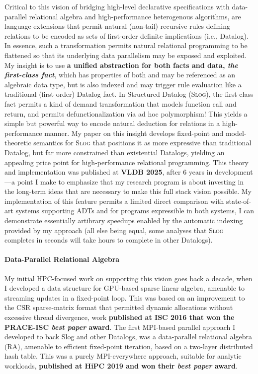 \documentclass[12pt]{article}
\begin{document}
Critical to this vision of bridging high-level declarative specifications with data-parallel relational algebra and high-performance heterogenous algorithms, are language extensions that permit natural (non-tail) recursive rules defining relations to be encoded as sets of first-order definite implications (i.e., Datalog). In essence, such a transformation permits natural relational programming to be flattened so that its underlying data parallelism may be exposed and exploited. My insight is to use \textbf{a unified abstraction for both facts and data, \emph{the first-class fact}}, which has properties of both and may be referenced as an algebraic data type, but is also indexed and may trigger rule evaluation like a traditional (first-order) Datalog fact. In Structured Datalog (\textsc{Slog}), the first-class fact permits a kind of demand transformation that models function call and return, and permits defunctionalization via ad hoc polymorphism! This yields a simple but powerful way to encode natural deduction for relations in a high-performance manner. My paper on this insight develops fixed-point and model-theoretic semantics for \textsc{Slog} that positions it as more expressive than traditional Datalog, but far more constrained than existential Datalogs, yielding an appealing price point for high-performance relational programming. This theory and implementation was published at \textbf{VLDB 2025}, after 6 years in development---a point I make to emphasize that my research program is about investing in the long-term ideas that are necessary to make this full stack vision possible. My implementation of this feature permits a limited direct comparison with state-of-art systems supporting ADTs and for programs expressible in both systems, I can demonstrate essentially artibrary speedups enabled by the automatic indexing provided by my approach (all else being equal, some analyses that \textsc{Slog} completes in seconds will take hours to complete in other Datalogs).

\paragraph{Data-Parallel Relational Algebra}

My initial HPC-focused work on supporting this vision goes back a decade, when I developed a data structure for GPU-based sparse linear algebra, amenable to streaming updates in a fixed-point loop. This was based on an improvement to the CSR sparse-matrix format that permitted dynamic allocations without excessive thread divergence, work \textbf{published at ISC 2016 that won the PRACE-ISC \emph{best paper} award}.
The first MPI-based parallel approach I developed to back Slog and other Datalogs, was a data-parallel relational algebra (RA), amenable to efficient fixed-point iteration, based on a two-layer distributed hash table. This was a purely MPI-everywhere approach, suitable for analytic workloads, \textbf{published at HiPC 2019 and won their \emph{best paper} award}. 
\end{document}
